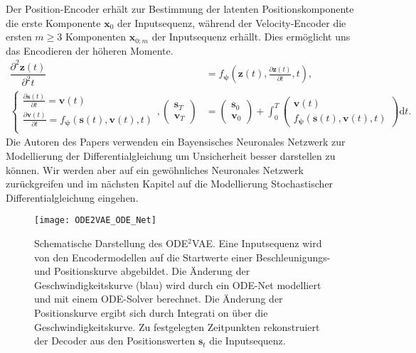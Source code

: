 \documentclass[12pt]{article}
\begin{document}
	Der Position-Encoder erhält zur Bestimmung der latenten Positionskomponente die erste Komponente $\mathbf x_{0}$ der Inputsequenz, während der Velocity-Encoder die ersten $m\geq 3$ Komponenten $\mathbf x_{0:m}$ der Inputsequenz erhällt. Dies ermöglicht uns das Encodieren der höheren Momente.
	\begin{align*}
	\dfrac{\partial^2 \mathbf{z}(t)}{\partial^2 t}&=f_{\boldsymbol{\psi}}\left(\mathbf{z}(t), \tfrac{\partial \mathbf{z}(t)}{\partial t}, t\right), \\
	\begin{cases*}
	\tfrac{\partial \mathbf{s}(t)}{\partial t}=\mathbf v(t) \\
	\tfrac{\partial \mathbf{v}(t)}{\partial t}=f_{\boldsymbol{\psi}}(\mathbf s(t), \mathbf v(t), t) \\
	\end{cases*},
	\left(\begin{array}{cc}
	\mathbf s_{T} \\
	\mathbf v_{T}
	\end{array}\right)
	&=
	\left(\begin{array}{cc}
	\mathbf s_{0} \\
	\mathbf v_{0}
	\end{array}\right)
	+
	\int_{0}^{T}
	\left(\begin{array}{cc}
	\mathbf v(t) \\
	f_{\boldsymbol{\psi}}(\mathbf s(t), \mathbf v(t), t)
	\end{array}\right)
	\mathrm{d}t.
	\end{align*}
	Die Autoren des Papers verwenden ein Bayensisches Neuronales Netzwerk zur Modellierung der Differentialgleichung um Unsicherheit besser darstellen zu können. Wir werden aber auf ein gewöhnliches Neuronales Netzwerk zurückgreifen und im nächsten Kapitel auf die Modellierung Stochastischer Differentialgleichung eingehen.
	\begin{figure}[h!]
		\centering
		\texttt{[image: ODE2VAE\_ODE\_Net]}
		\captionsetup{labelformat=empty}
		\caption{Schematische Darstellung des ODE$^2$VAE. Eine Inputsequenz wird von den Encodermodellen auf die Startwerte einer Beschleunigungs- und Positionskurve abgebildet. Die Änderung der Geschwindigkeitskurve (blau) wird durch ein ODE-Net modelliert und mit einem ODE-Solver berechnet. Die Änderung der Positionskurve ergibt sich durch Integrati%
			 on über die Geschwindigkeitskurve. Zu festgelegten Zeitpunkten rekonstruiert der Decoder aus den Positionswerten $\mathbf{s}_t$ die Inputsequenz.}
	\end{figure}
\end{document}
